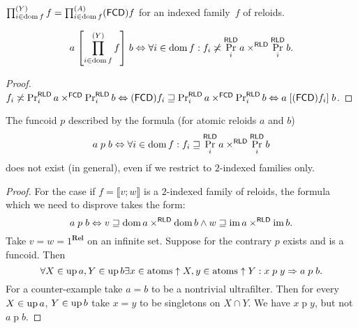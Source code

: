 
\begin{defn}
  $\prod^{(Y)}_{i \in \operatorname{dom} f} f = \prod^{(A)}_{i \in \operatorname{dom} f}
  (\mathsf{FCD}) f$ for an indexed family~$f$ of reloids.
\end{defn}

\begin{prop}
  \[ a \mathrel{\left[ \prod^{(Y)}_{i \in \operatorname{dom} f} f \right]} b
  \Leftrightarrow \forall i \in \operatorname{dom} f : f_i \not\asymp
  \Pr^{\mathsf{RLD}}_i a \times^{\mathsf{RLD}}
  \Pr^{\mathsf{RLD}}_i b. \]
\end{prop}

\begin{proof}
  $f_i \not\asymp \Pr^{\mathsf{RLD}}_i a \times^{\mathsf{FCD}} \Pr^{\mathsf{RLD}}_i b
  \Leftrightarrow (\mathsf{FCD}) f_i \sqsupseteq
  \Pr^{\mathsf{RLD}}_i a \times^{\mathsf{FCD}} \Pr^{\mathsf{RLD}}_i b \Leftrightarrow
  a \mathrel{[(\mathsf{FCD}) f_i]} b$.
\end{proof}

\begin{example}
  The funcoid $p$ described by the formula (for atomic reloids $a$ and $b$)
  \[ a \mathrel{\mathrel{p}} b \Leftrightarrow \forall i \in \operatorname{dom} f : f_i
     \sqsupseteq \Pr^{\mathsf{RLD}}_i a \times^{\mathsf{RLD}}
     \Pr^{\mathsf{RLD}}_i b \]
  does not exist (in general), even if we restrict to $2$-indexed families
  only.
\end{example}

\begin{proof}
  For the case if $f = \llbracket v ; w \rrbracket$ is a $2$-indexed family of
  reloids, the formula which we need to disprove takes the form:
  \[ a \mathrel{\mathrel{p}} b \Leftrightarrow v \sqsupseteq \operatorname{dom} a
     \times^{\mathsf{RLD}} \operatorname{dom} b \wedge w \sqsupseteq \operatorname{im}
     a \times^{\mathsf{RLD}} \operatorname{im} b. \]
  Take $v = w = 1^{\mathbf{Rel}}$ on an infinite set. Suppose for the
  contrary $p$ exists and is a funcoid. Then
  \[ \forall X \in \operatorname{up} a, Y \in \operatorname{up} b \exists x \in \operatorname{atoms}
     \uparrow X, y \in \operatorname{atoms} \uparrow Y : x \mathrel{\mathrel{p}} y \Rightarrow
     a \mathrel{\mathrel{p}} b. \]
  For a counter-example take $a = b$ to be a nontrivial ultrafilter. Then for
  every $X \in \operatorname{up} a$, $Y \in \operatorname{up} b$ take $x = y$ to be singletons
  on $X \cap Y$. We have $x \mathrel{\mathrel{p}} y$, but not $a \mathrel{\mathrel{p}} b$.
\end{proof}